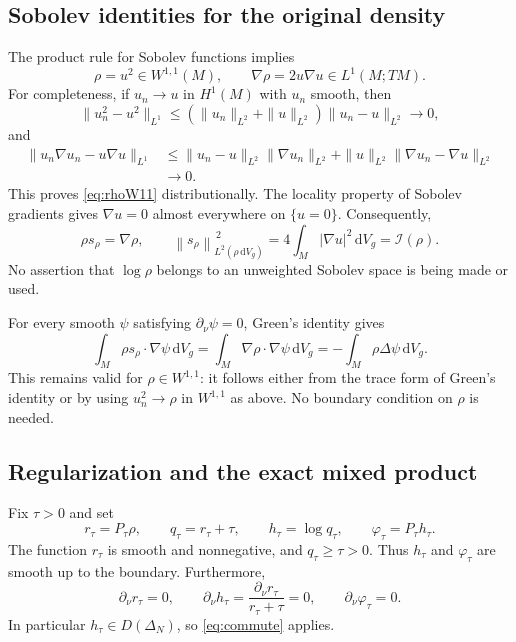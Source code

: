 \documentclass[11pt]{article}
\newcommand{\dd}{\,\mathrm{d}}
\newcommand{\dV}{\dd V_g}
\newcommand{\I}{\mathcal I}
\newcommand{\normrho}[1]{\left\lVert #1\right\rVert_{L^2(\rho\,\mathrm{d}V_g)}}
\begin{document}
\subsection{Sobolev identities for the original density}
The product rule for Sobolev functions implies
\begin{equation}\label{eq:rhoW11}
 \rho=u^2\in W^{1,1}(M),\qquad \nabla\rho=2u\nabla u\in L^1(M;TM).
\end{equation}
For completeness, if $u_n\to u$ in $H^1(M)$ with $u_n$ smooth, then
\[
 \|u_n^2-u^2\|_{L^1}
 \leq(\|u_n\|_{L^2}+\|u\|_{L^2})\|u_n-u\|_{L^2}\longrightarrow0,
\]
and
\begin{align*}
 \|u_n\nabla u_n-u\nabla u\|_{L^1}
 &\leq\|u_n-u\|_{L^2}\|\nabla u_n\|_{L^2}
       +\|u\|_{L^2}\|\nabla u_n-\nabla u\|_{L^2}\\
 &\longrightarrow0.
\end{align*}
This proves \eqref{eq:rhoW11} distributionally. The locality property of Sobolev gradients gives $\nabla u=0$ almost everywhere on $\{u=0\}$. Consequently,
\begin{equation}\label{eq:scoreidentity}
 \rho s_\rho=\nabla\rho,\qquad
 \normrho{s_\rho}^{\,2}=4\int_M|\nabla u|^2\dV=\I(\rho).
\end{equation}
No assertion that $\log\rho$ belongs to an unweighted Sobolev space is being made or used.

For every smooth $\psi$ satisfying $\partial_\nu\psi=0$, Green's identity gives
\begin{equation}\label{eq:weakgreen}
 \int_M\rho s_\rho\cdot\nabla\psi\dV
 =\int_M\nabla\rho\cdot\nabla\psi\dV
 =-\int_M\rho\Delta\psi\dV.
\end{equation}
This remains valid for $\rho\in W^{1,1}$: it follows either from the trace form of Green's identity or by using $u_n^2\to\rho$ in $W^{1,1}$ as above. No boundary condition on $\rho$ is needed.

\subsection{Regularization and the exact mixed product}
Fix $\tau>0$ and set
\[
 r_\tau=P_\tau\rho,\qquad q_\tau=r_\tau+\tau,
 \qquad h_\tau=\log q_\tau,\qquad \varphi_\tau=P_\tau h_\tau.
\]
The function $r_\tau$ is smooth and nonnegative, and $q_\tau\geq\tau>0$. Thus $h_\tau$ and $\varphi_\tau$ are smooth up to the boundary. Furthermore,
\[
 \partial_\nu r_\tau=0,
 \qquad \partial_\nu h_\tau=
 \frac{\partial_\nu r_\tau}{r_\tau+\tau}=0,
 \qquad \partial_\nu\varphi_\tau=0.
\]
In particular $h_\tau\in D(\Delta_N)$, so \eqref{eq:commute} applies.
\end{document}
